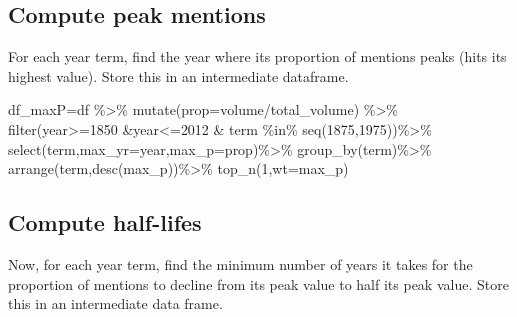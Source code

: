 \documentclass[
]{article}
\newenvironment{Shaded}{\begin{snugshade}}{\end{snugshade}}
\newcommand{\AttributeTok}[1]{\textcolor[rgb]{0.77,0.63,0.00}{#1}}
\newcommand{\DecValTok}[1]{\textcolor[rgb]{0.00,0.00,0.81}{#1}}
\newcommand{\FunctionTok}[1]{\textcolor[rgb]{0.00,0.00,0.00}{#1}}
\newcommand{\NormalTok}[1]{#1}
\newcommand{\OtherTok}[1]{\textcolor[rgb]{0.56,0.35,0.01}{#1}}
\newcommand{\SpecialCharTok}[1]{\textcolor[rgb]{0.00,0.00,0.00}{#1}}
\begin{document}
\hypertarget{compute-peak-mentions}{%
\subsection{Compute peak mentions}\label{compute-peak-mentions}}

For each year term, find the year where its proportion of mentions peaks
(hits its highest value). Store this in an intermediate dataframe.

\begin{Shaded}
\begin{Highlighting}[]
\NormalTok{df\_maxP}\OtherTok{=}\NormalTok{df }\SpecialCharTok{\%\textgreater{}\%} \FunctionTok{mutate}\NormalTok{(}\AttributeTok{prop=}\NormalTok{volume}\SpecialCharTok{/}\NormalTok{total\_volume) }\SpecialCharTok{\%\textgreater{}\%}
  \FunctionTok{filter}\NormalTok{(year}\SpecialCharTok{\textgreater{}=}\DecValTok{1850} \SpecialCharTok{\&}\NormalTok{year}\SpecialCharTok{\textless{}=}\DecValTok{2012} \SpecialCharTok{\&}\NormalTok{ term }\SpecialCharTok{\%in\%} \FunctionTok{seq}\NormalTok{(}\DecValTok{1875}\NormalTok{,}\DecValTok{1975}\NormalTok{))}\SpecialCharTok{\%\textgreater{}\%}
  \FunctionTok{select}\NormalTok{(term,}\AttributeTok{max\_yr=}\NormalTok{year,}\AttributeTok{max\_p=}\NormalTok{prop)}\SpecialCharTok{\%\textgreater{}\%}
  \FunctionTok{group\_by}\NormalTok{(term)}\SpecialCharTok{\%\textgreater{}\%}
  \FunctionTok{arrange}\NormalTok{(term,}\FunctionTok{desc}\NormalTok{(max\_p))}\SpecialCharTok{\%\textgreater{}\%}
  \FunctionTok{top\_n}\NormalTok{(}\DecValTok{1}\NormalTok{,}\AttributeTok{wt=}\NormalTok{max\_p)}
\end{Highlighting}
\end{Shaded}

\hypertarget{compute-half-lifes}{%
\subsection{Compute half-lifes}\label{compute-half-lifes}}

Now, for each year term, find the minimum number of years it takes for
the proportion of mentions to decline from its peak value to half its
peak value. Store this in an intermediate data frame.
\end{document}

